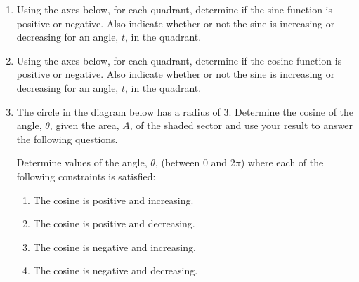 \begin{enumerate}
\item Using the axes below, for each quadrant, determine if the sine
  function is positive or negative. Also indicate whether or not the
  sine is increasing or decreasing for an angle, $t$, in the quadrant.
  

\item Using the axes below, for each quadrant, determine if the cosine
  function is positive or negative. Also indicate whether or not the
  sine is increasing or decreasing for an angle, $t$, in the quadrant.
  

\item The circle in the diagram below has a radius of 3.  Determine
  the cosine of the angle, $\theta$, given the area, $A$, of the
  shaded sector and use your result to answer the following questions.
  \\ \samepage
  
  Determine values of the angle, $\theta$, (between 0 and $2\pi$) where
  each of the following constraints is satisfied:
  \begin{enumerate}
  \item The cosine is positive and increasing.
  \item The cosine is positive and decreasing.
  \item The cosine is negative and increasing.
  \item The cosine is negative and decreasing.
  \end{enumerate}


\end{enumerate}

